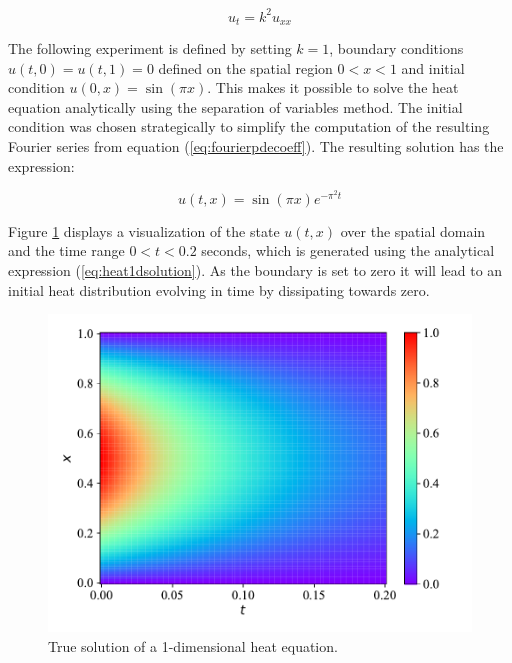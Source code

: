\begin{equation}
    u_t = k^2 u_{xx}
    \label{eq:heat1d}
\end{equation}

The following experiment is defined by setting $k = 1$, boundary conditions $u(t, 0) = u(t, 1) = 0$ defined on the spatial region $0 < x < 1$ and initial condition $u(0, x) = \sin(\pi x)$. This makes it possible to solve the heat equation analytically using the separation of variables method. The initial condition was chosen strategically to simplify the computation of the resulting Fourier series from equation (\ref{eq:fourierpdecoeff}). The resulting solution has the expression:

\begin{equation}
    u(t, x) = \sin(\pi x) e^{- \pi^2 t}
    \label{eq:heat1dsolution}
\end{equation}

Figure \ref{fig:heat1d_true} displays a visualization of the state $u(t, x)$ over the spatial domain and the time range $0 < t < 0.2$ seconds, which is generated using the analytical expression (\ref{eq:heat1dsolution}). As the boundary is set to zero it will lead to an initial heat distribution evolving in time by dissipating towards zero.

\begin{figure}[H]
    \centering
    \includegraphics[width=1.0\linewidth]{Figures/InitialExperiments/heat1d_true.pdf}
    \caption{True solution of a 1-dimensional heat equation.}
    \label{fig:heat1d_true}
\end{figure}

